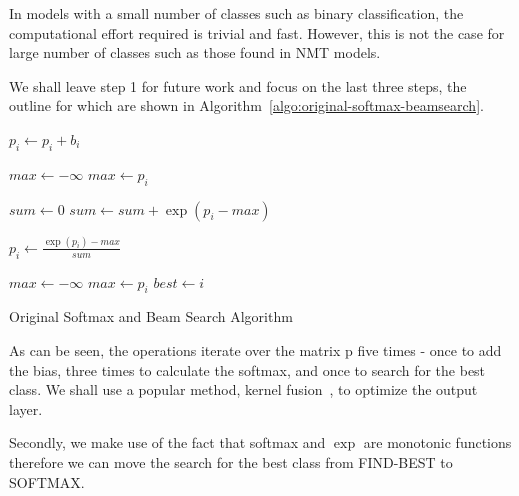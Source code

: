 \documentclass[11pt,a4paper]{article}
\begin{document}
In models with a small number of classes such as binary classification, the computational effort required is trivial and fast. However, this is not the case for large number of classes such as those found in NMT models.

We shall leave step 1 for future work and focus on the last three steps, the outline for which are shown in Algorithm~\ref{algo:original-softmax-beamsearch}.

\begin{algorithm} 
\begin{algorithmic}

  \State $p_i \gets p_i + b_i$
\EndFor 
\EndProcedure

\State


\State $max \gets - \infty$ 
    \State $max \gets p_i$
  \EndIf
\EndFor

\State $sum \gets 0$ 
  \State $sum \gets sum + \exp(p_i - max)$
\EndFor

  \State $p_i \gets \frac{\exp(p_i) - max}{sum} $
\EndFor 

\EndProcedure

\State


\State $max \gets - \infty$ 
    \State $max \gets p_i$
    \State $best \gets i$
  \EndIf
\EndFor 

\EndProcedure

\end{algorithmic}
\caption{Original Softmax and Beam Search Algorithm}
\label{algo:original-softmax-beamsearch}
\end{algorithm}


As can be seen, the operations iterate over the matrix p five times - once to add the bias, three times to calculate the softmax, and once to search for the best class. We shall use a popular method, kernel fusion~\citep{Guevara2009EnablingTP}, to optimize the output layer.

Secondly, we make use of the fact that softmax and $\exp$ are monotonic functions therefore we can move the search for the best class from FIND-BEST to SOFTMAX.
\end{document}
